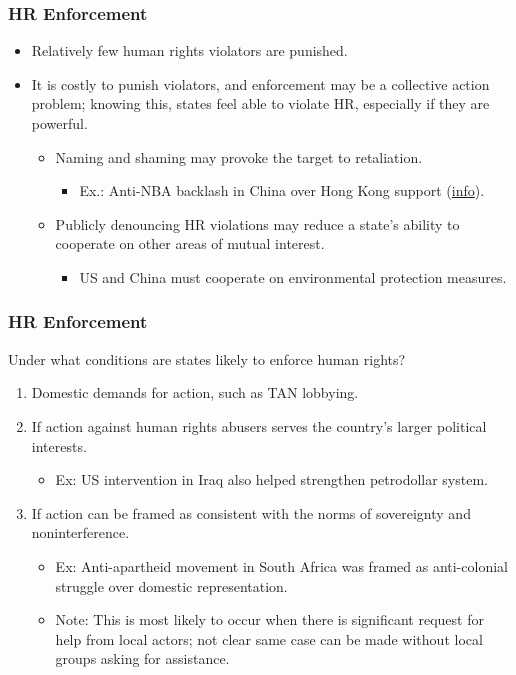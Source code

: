 \documentclass{beamer}
\begin{document}
\begin{frame} 
	\frametitle{\LARGE{HR Enforcement}}
	\begin{itemize}
		\item Relatively few human rights violators are punished. \pause
		\item It is costly to punish violators, and enforcement may be a collective action problem; knowing this, states feel able to violate HR, especially if they are powerful. \pause
		\begin{itemize}
			\item Naming and shaming may provoke the target to retaliation. \pause
			\begin{itemize}
				\item Ex.:  Anti-NBA backlash in China over Hong Kong support (\href{https://www.businessinsider.com/nba-china-feud-timeline-daryl-morey-tweet-hong-kong-protests-2019-10}{info}).
				
			\end{itemize}
			\item Publicly denouncing HR violations may reduce a state's ability to cooperate on other areas of mutual interest. \pause
			\begin{itemize}
				\item US and China must cooperate on environmental protection measures.
			\end{itemize}
		\end{itemize}
	\end{itemize}
\end{frame}

\begin{frame} 
	\frametitle{\LARGE{HR Enforcement}}
	Under what conditions are states likely to enforce human rights?
	\begin{enumerate}
		\item Domestic demands for action, such as TAN lobbying. \pause
		\item If action against human rights abusers serves the country’s larger political interests. \pause
		\begin{itemize}
			\item Ex: US intervention in Iraq also helped strengthen petrodollar system. \pause
		\end{itemize}
		\item If action can be framed as consistent with the norms of sovereignty and noninterference. \pause 
		\begin{itemize}
			\item Ex: Anti-apartheid movement in South Africa was framed as anti-colonial struggle over domestic representation.
			\item Note: This is most likely to occur when there is significant request for help from local actors; not clear same case can be made without local groups asking for assistance.
			
		\end{itemize}
		
		
	\end{enumerate}
\end{frame}
\end{document}
